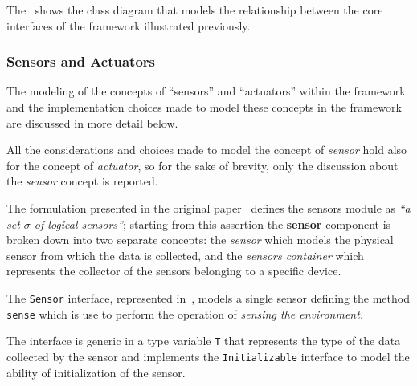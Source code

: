 The~ shows the class diagram that models the relationship between the core interfaces of the framework
illustrated previously.

\subsubsection{Sensors and Actuators}

The modeling of the concepts of ``sensors'' and ``actuators'' within the framework and the implementation choices made to model these concepts in the
framework are discussed in more detail below.

All the considerations and choices made to model the concept of \emph{sensor} hold also for the concept of \emph{actuator}, so for the sake of
brevity, only the discussion about the \emph{sensor} concept is reported.

The formulation presented in the original paper~\cite{fi12110203} defines the sensors module as \textit{``a set $\sigma$ of logical sensors''};
starting from this assertion the \textbf{sensor} component is broken down into two separate concepts: the \emph{sensor} which models the physical
sensor from which the data is collected, and the \emph{sensors container} which represents the collector of the sensors belonging to a specific
device.

The \texttt{Sensor} interface, represented in~, models a single sensor defining the method \texttt{sense} which is use to
perform the operation of \emph{sensing the environment.}



The interface is generic in a type variable \texttt{T} that represents the type of the data collected by the sensor and implements the
\texttt{Initializable} interface to model the ability of initialization of the sensor.

